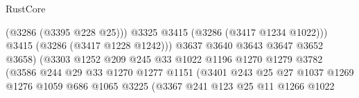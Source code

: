 \begin{lexlean}{RustCore}
\begin{coremodule}
                                                    (@3286 (@3395 @228 @25)))
                                                  @3325
                                                  @3415
                                                  (@3286 (@3417 @1234 @1022)))
                                                @3415
                                                (@3286 (@3417 @1228 @1242)))
                                              @3637
                                              @3640
                                              @3643
                                              @3647
                                              @3652
                                              @3658)
                                            (@3303
                                              @1252
                                              @209
                                              @245
                                              @33
                                              @1022
                                              @1196
                                              @1270
                                              @1279
                                              @3782
                                              (@3586
                                                @244
                                                @29
                                                @33
                                                @1270
                                                @1277
                                                @1151
                                                (@3401
                                                  @243
                                                  @25
                                                  @27
                                                  @1037
                                                  @1269
                                                  @1276
                                                  @1059
                                                  @686
                                                  @1065
                                                  @3225
                                                  (@3367
                                                    @241
                                                    @123
                                                    @25
                                                    @11
                                                    @1266
                                                    @1022

\end{coremodule}
\end{lexlean}
